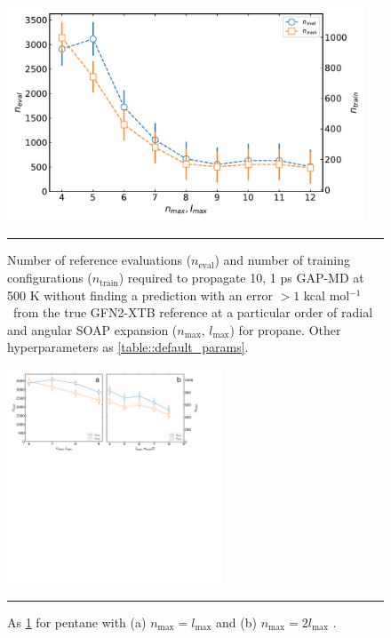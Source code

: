 \documentclass[11pt]{article}
\numberwithin{equation}{subsection}
\newcommand{\kcal}{kcal mol$^{-1}$}
\newcommand{\comment}[1]{}
\begin{document}
\comment{
	TJW:  10x1 ps GAP-MD?
	TJW: Why is the graph for propane convex while pentane is concave?
}


\begin{figure}[h!]
	\centering
	\vspace{0.4cm}
	\includegraphics[height=6.4cm]{figSX2.pdf}
	\vspace{0.0cm}
	\hrule
	\vspace{0.1cm}
	\caption{Number of reference evaluations ($n_\text{eval}$) and number of training configurations ($n_\text{train}$) required to propagate 10, 1 ps  GAP-MD at 500 K without finding a prediction with an error $> 1$ \kcal~from the true GFN2-XTB reference at a particular order of radial and angular SOAP expansion ($n_\text{max},\, l_\text{max}$) for propane. Other hyperparameters as \tablename{ \ref{table::default_params}}.}
	\label{fig::SX2}
\end{figure}


\begin{figure}[h!]
	\centering
	\vspace{0.4cm}
	\includegraphics[height=6.4cm]{figSX6.pdf}
	\vspace{0.2cm}
	\hrule
	\vspace{0.1cm}
	\caption{As \figurename{ \ref{fig::SX2}} for pentane with (a) $n_\text{max} = l_\text{max}$ and (b) $n_\text{max} = 2l_\text{max}$ .}
	\label{fig::SX6}
\end{figure}
\end{document}
